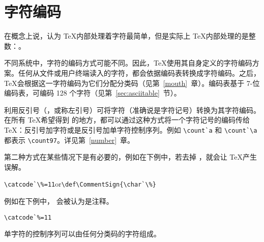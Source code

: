 \documentclass{book}
\begin{document}
\section{字符编码}
\label{char:code}

在概念上说，认为 \TeX 内部处理着字符最简单，但是实际上 \TeX 内部处理的是整数：。

不同系统中，字符的编码方式可能不同。因此，\TeX 使用其自身定义的字符编码方案。任何从文件或用户终端读入的字符，都会依据编码表转换成字符编码。之后，\TeX 会根据这一字符编码为它们分配分类码（见第~\ref{mouth}~章）。编码表基于 7-位 \ascii 编码表，可编码 128 个字符（见第~\ref{sec:asciitable}~节）。

利用反引号（，或称左引号）可将字符（准确说是字符记号）转换为其字符编码。在所有 \TeX 希望得到  的地方，都可以通过这种方式将一个字符记号的编码传给 \TeX：反引号加字符或是反引号加单字符控制序列。例如 \verb.\count`a. 和 \verb.\count`\a. 都表示 \verb.\count97.。详见第~\ref{number}~章。

第二种方式在某些情况下是有必要的，例如在下例中，若去掉 \cs{}，就会让 \TeX 产生误解。
\begin{disp}\verb>\catcode`\%=11>\quad or\quad \verb>\def\CommentSign{\char`\%}>\end{disp}
例如在下例中， 会被认为是注释。
\begin{verbatim}
\catcode`%=11
\end{verbatim}
单字符的控制序列可以由任何分类码的字符组成。
\end{document}
